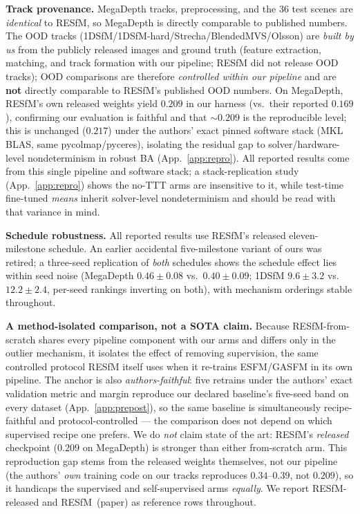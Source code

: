 \documentclass{article}
\begin{document}
\noindent\textbf{Track provenance.} MegaDepth tracks, preprocessing, and the 36 test scenes
are \emph{identical} to RESfM, so MegaDepth is directly comparable to published numbers. The
OOD tracks (1DSfM/1DSfM-hard/Strecha/BlendedMVS/Olsson) are \emph{built by us} from the
publicly released images and ground truth (feature extraction, matching, and track
formation with our pipeline; RESfM did not release OOD tracks); OOD comparisons are therefore \emph{controlled within our pipeline} and are
\textbf{not} directly comparable to RESfM's published OOD numbers. On MegaDepth, RESfM's
own released weights yield $0.209$ in our harness (vs.\ their reported $0.169$),
confirming our evaluation is faithful and that $\sim\!0.209$ is the reproducible level;
this is unchanged ($0.217$) under the authors' exact pinned software stack (MKL BLAS,
same pycolmap/pyceres), isolating the residual gap to solver/hardware-level
nondeterminism in robust BA (App.~\ref{app:repro}). All reported results come from this
single pipeline and software stack; a stack-replication study (App.~\ref{app:repro}) shows the
no-TTT arms are insensitive to it, while test-time fine-tuned \emph{means} inherit
solver-level nondeterminism and should be read with that variance in mind.

\noindent\textbf{Schedule robustness.} All reported results use RESfM's released
eleven-milestone schedule. An earlier accidental five-milestone variant of ours was
retired; a three-seed replication of \emph{both} schedules shows the schedule effect lies
within seed noise (MegaDepth $0.46\pm0.08$ vs.\ $0.40\pm0.09$; 1DSfM $9.6\pm3.2$ vs.\
$12.2\pm2.4$, per-seed rankings inverting on both), with mechanism orderings stable
throughout.

\noindent\textbf{A method-isolated comparison, not a SOTA claim.} Because
RESfM-from-scratch shares every pipeline component with our arms and differs only in the
outlier mechanism, it isolates the effect of removing supervision, the same controlled
protocol RESfM itself uses when it re-trains ESFM/GASFM in its own pipeline. The anchor
is also \emph{authors-faithful}: five retrains under the authors' exact validation metric
and margin reproduce our declared baseline's five-seed band on every dataset
(App.~\ref{app:prepost}), so the same baseline is simultaneously recipe-faithful and
protocol-controlled --- the comparison does not depend on which supervised recipe one
prefers. We do
\emph{not} claim state of the art: RESfM's \emph{released} checkpoint ($0.209$ on
MegaDepth) is stronger than either from-scratch arm. This reproduction gap stems from the
released weights themselves, not our pipeline (the authors' \emph{own} training code on
our tracks reproduces $0.34$--$0.39$, not $0.209$), so it handicaps the
supervised and self-supervised arms \emph{equally}. We report RESfM-released and
RESfM~(paper) as reference rows throughout.
\end{document}
